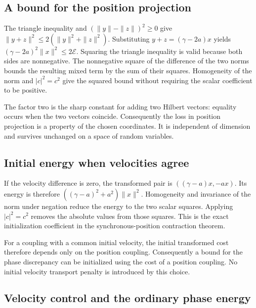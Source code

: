 \documentclass[11pt,a4paper]{report}
\begin{document}
\subsection{\texorpdfstring{A bound for the position projection}{A bound for the position projection}}
\label{report-step-KineticLangevin-Geometry-lean-3}


The triangle inequality and \((\|y\|-\|z\|)^2\ge0\) give \(\|y+z\|^2\le2(\|y\|^2+\|z\|^2)\). Substituting \(y+z=(\gamma-2a)x\) yields \((\gamma-2a)^2\|x\|^2\le2\mathcal E\). Squaring the triangle inequality is valid because both sides are nonnegative. The nonnegative square of the difference of the two norms bounds the resulting mixed term by the sum of their squares. Homogeneity of the norm and \(|c|^2=c^2\) give the squared bound without requiring the scalar coefficient to be positive.



The factor two is the sharp constant for adding two Hilbert vectors: equality occurs when the two vectors coincide. Consequently the loss in position projection is a property of the chosen coordinates. It is independent of dimension and survives unchanged on a space of random variables.

\subsection{\texorpdfstring{Initial energy when velocities agree}{Initial energy when velocities agree}}
\label{report-step-KineticLangevin-Geometry-lean-4}


If the velocity difference is zero, the transformed pair is \(((\gamma-a)x,-ax)\). Its energy is therefore \(((\gamma-a)^2+a^2)\|x\|^2\). Homogeneity and invariance of the norm under negation reduce the energy to the two scalar squares. Applying \( |c|^2=c^2 \) removes the absolute values from those squares. This is the exact initialization coefficient in the synchronous-position contraction theorem.



For a coupling with a common initial velocity, the initial transformed cost therefore depends only on the position coupling. Consequently a bound for the phase discrepancy can be initialized using the cost of a position coupling. No initial velocity transport penalty is introduced by this choice.

\subsection{\texorpdfstring{Velocity control and the ordinary phase energy}{Velocity control and the ordinary phase energy}}
\label{report-step-KineticLangevin-Geometry-lean-5}
\end{document}
